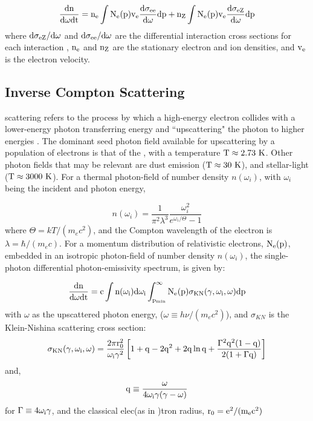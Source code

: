 \begin{equation}
{\rm \frac{d n}{d \omega d t} =
	n_e \int
	N_e(p) v_e
	\frac{d \sigma_{e e}}{d \omega}dp +
	n_Z \int
	N_e(p) v_e
	\frac{d \sigma_{e Z}}{d \omega}dp}
\end{equation}
where ${\rm d \sigma_{e Z}/d \omega}$ and ${\rm d \sigma_{e e}/d \omega}$ are the differential interaction cross sections for each interaction \citep{Koch59,Haug75}, ${\rm n_e}$ and ${\rm n_Z}$ are the stationary electron and ion densities, and ${\rm v_e}$ is the electron velocity.

\subsection{Inverse Compton Scattering}\label{gamAstr:IC}

\ic{} scattering refers to the process by which a high-energy electron collides with a lower-energy photon transferring energy and ``upscattering" the photon to higher energies \citep{Blumenthal70}. The dominant seed photon field available for upscattering by a population of electrons is that of the \cmb{}, with a temperature ${\rm T \approx 2.73~K}$. Other photon fields that may be relevant are \fir{} dust emission (${\rm T \approx 30~K}$), and \nir{} stellar-light (${\rm T \approx 3000~K}$). For a thermal photon-field of number density $n(\omega_i)$, with $\omega_i$ being the incident and photon energy,

\begin{equation}
n(\omega_i) = 
\frac{1}{\pi^2\lambda^3} 
\frac{\omega_i^2}{e^{\omega_i/\Theta} -1}
\end{equation}
where  $\Theta=kT/(m_e c^2)$, and the Compton wavelength of the electron is $\lambda=\hbar/(m_e c)$.
For a momentum distribution of relativistic electrons, ${\rm N_e(p)}$, embedded in an isotropic photon-field of number density $n(\omega_i)$, the single-photon differential photon-emissivity spectrum,  is given by:

\begin{equation}
{\rm \frac{dn}{d\omega dt} = 
c \int  n(\omega_i)d \omega_i
\int_{p_{min}}^\infty 
N_e(p)  \sigma_{KN}(\gamma,\omega_i,\omega)dp}
\end{equation}
with $\omega$ as the upscattered photon energy, ($\omega\equiv h\nu/(m_e c^2)$), and $\sigma_{KN}$ is the Klein-Nishina scattering  cross section:
\begin{equation}
{\rm \sigma_{KN}(\gamma,\omega_i,\omega) = \frac{2\pi r_0^2}{\omega_i \gamma^2}
\left[
1 + q - 2q^2 + 2q\ln q + \frac{\Gamma^2 q^2 (1-q)}{2(1+\Gamma q)}
\right]}
\end{equation}
and,
\begin{equation}
{\rm q \equiv \frac{\omega}{4 \omega_i \gamma (\gamma-\omega)}}
\end{equation}
for ${\rm \Gamma \equiv 4\omega_i \gamma}$, and the classical elec(as in \cite{Houck06})tron radius, ${\rm r_0 = e^2/(m_e c^2)}$

